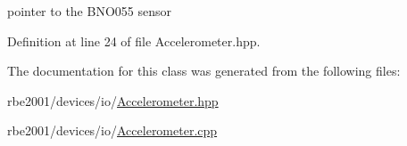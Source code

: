 pointer to the B\+N\+O055 sensor 



Definition at line 24 of file Accelerometer.\+hpp.



The documentation for this class was generated from the following files\+:\begin{DoxyCompactItemize}
\item 
rbe2001/devices/io/\hyperlink{_accelerometer_8hpp}{Accelerometer.\+hpp}\item 
rbe2001/devices/io/\hyperlink{_accelerometer_8cpp}{Accelerometer.\+cpp}\end{DoxyCompactItemize}
